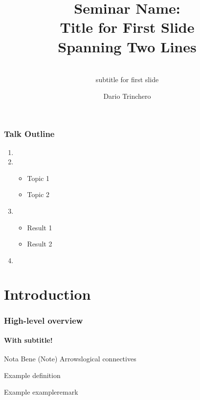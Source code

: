 \documentclass[%
	smaller%
]{beamer}
\title[%
	Title for footer
]{\texorpdfstring{%
	{\huge\mdseries\color{SUSoil} Seminar Name:}\\[0.1em]
	\Huge Title for First Slide\\[0.2em]
	Spanning Two Lines
}{%
	Title for PDF reader
}}
\subtitle{\texorpdfstring{\\
	\col{Stylized} subtitle for first slide
}{%
	Subtitle for PDF reader
}}
\author[dario.trinchero@pm.me]{Dario Trinchero}
\institute{Stellenbosch University}
\begin{document}
	\begin{frame}
		\titlepage
	\end{frame}


	\begin{frame}[noframenumbering]
		\frametitle{Talk Outline}

		\begin{enumerate}
			\setlength{\itemsep}{0.7em}
			\item {}
			\item {}
				\begin{itemize}
					\item Topic 1
					\item Topic 2
				\end{itemize}
			\item {}
				\begin{itemize}
					\item Result 1
					\item Result 2
				\end{itemize}
			\item {}
		\end{enumerate}
	\end{frame}

	\section{Introduction}

	\begin{frame}
		\frametitle{High-level overview}
		\framesubtitle{With subtitle!}

		\begin{note}{Nota Bene (Note)}
			Arrows\becomes logical connectives
		\end{note}

		\vfill
		\begin{definition}[Definition]
			Example definition
		\end{definition}

		\vfill
		\begin{example}[Example]
			Example example\becomes* remark \bang
		\end{example}
	\end{frame}
\end{document}
